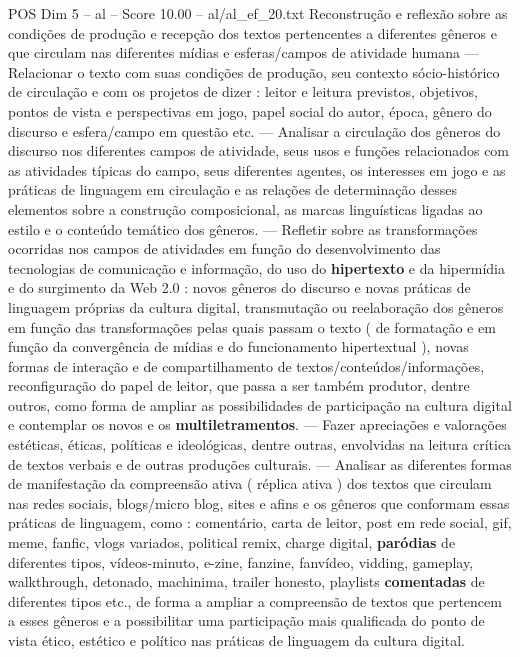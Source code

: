 \begin{textsample}{POS Dim 5 – al – Score 10.00 – al/al\_ef\_20.txt}  \label{ex:f5_pos_044}
Reconstrução e reflexão sobre as condições de produção e recepção dos textos pertencentes a diferentes gêneros e que circulam nas diferentes mídias e esferas/campos de atividade humana — Relacionar o texto com suas condições de produção, seu contexto sócio-histórico de circulação e com os projetos de dizer : leitor e leitura previstos, objetivos, pontos de vista e perspectivas em jogo, papel social do autor, época, gênero do discurso e esfera/campo em questão etc. — Analisar a circulação dos gêneros do discurso nos diferentes campos de atividade, seus usos e funções relacionados com as atividades típicas do campo, seus diferentes agentes, os interesses em jogo e as práticas de linguagem em circulação e as relações de determinação desses elementos sobre a construção composicional, as marcas linguísticas ligadas ao estilo e o conteúdo temático dos gêneros. — Refletir sobre as transformações ocorridas nos campos de atividades em função do desenvolvimento das tecnologias de comunicação e informação, do uso do \textbf{hipertexto} e da hipermídia e do surgimento da Web 2.0 : novos gêneros do discurso e novas práticas de linguagem próprias da cultura digital, transmutação ou reelaboração dos gêneros em função das transformações pelas quais passam o texto ( de formatação e em função da convergência de mídias e do funcionamento hipertextual ), novas formas de interação e de compartilhamento de textos/conteúdos/informações, reconfiguração do papel de leitor, que passa a ser também produtor, dentre outros, como forma de ampliar as possibilidades de participação na cultura digital e contemplar os novos e os \textbf{multiletramentos}. — Fazer apreciações e valorações estéticas, éticas, políticas e ideológicas, dentre outras, envolvidas na leitura crítica de textos verbais e de outras produções culturais. — Analisar as diferentes formas de manifestação da compreensão ativa ( réplica ativa ) dos textos que circulam nas redes sociais, blogs/micro blog, sites e afins e os gêneros que conformam essas práticas de linguagem, como : comentário, carta de leitor, post em rede social, gif, meme, fanfic, vlogs variados, political remix, charge digital, \textbf{paródias} de diferentes tipos, vídeos-minuto, e-zine, fanzine, fanvídeo, vidding, gameplay, walkthrough, detonado, machinima, trailer honesto, playlists \textbf{comentadas} de diferentes tipos etc., de forma a ampliar a compreensão de textos que pertencem a esses gêneros e a possibilitar uma participação mais qualificada do ponto de vista ético, estético e político nas práticas de linguagem da cultura digital.

\end{textsample}
